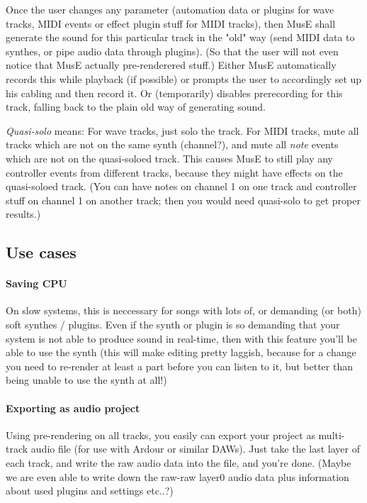\documentclass[a4paper]{report}
\begin{document}
Once the user changes any parameter (automation data or plugins for
wave tracks, MIDI events or effect plugin stuff for MIDI tracks),
then MusE shall generate the sound for this particular track in the
"old" way (send MIDI data to synthes, or pipe audio data through plugins).
(So that the user will not even notice that MusE actually pre-renderered
stuff.) Either MusE automatically records this while playback (if possible)
or prompts the user to accordingly set up his cabling and then record
it. Or (temporarily) disables prerecording for this track, falling back
to the plain old way of generating sound.

\emph{Quasi-solo} means: For wave tracks, just solo the track. For MIDI
tracks, mute all tracks which are not on the same synth (channel?),
and mute all \emph{note} events which are not on the quasi-soloed track.
This causes MusE to still play any controller events from different
tracks, because they might have effects on the quasi-soloed track. (You
can have notes on channel 1 on one track and controller stuff on channel
1 on another track; then you would need quasi-solo to get proper results.)

\subsection{Use cases}
\paragraph{Saving CPU}
On slow systems, this is neccessary for songs with lots of, or demanding
(or both) soft synthes / plugins. Even if the synth or plugin is so
demanding that your system is not able to produce sound in real-time,
then with this feature you'll be able to use the synth (this will make
editing pretty laggish, because for a change you need to re-render at
least a part before you can listen to it, but better than being unable
to use the synth at all!)

\paragraph{Exporting as audio project}
Using pre-rendering on all tracks, you easily can export your project
as multi-track audio file (for use with Ardour or similar DAWs).
Just take the last layer of each track, and write the raw audio data
into the file, and you're done. (Maybe we are even able to write down
the raw-raw layer0 audio data plus information about used plugins and
settings etc..?)
\end{document}
